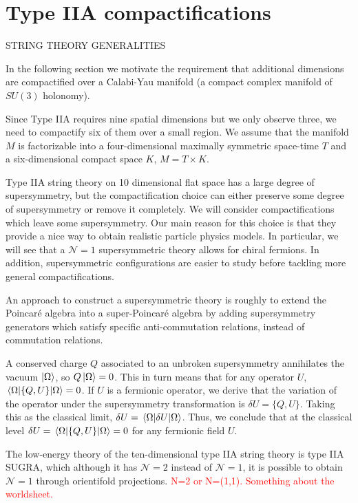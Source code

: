 \section{Type IIA compactifications}


STRING THEORY GENERALITIES


In the following section we motivate the requirement that additional dimensions are compactified
over a Calabi-Yau manifold (a compact complex manifold of $SU(3)$ holonomy).

Since Type IIA requires nine spatial dimensions but we only observe three, we need to compactify six of 
them over a small region.
We assume that the manifold $M$ is factorizable into a four-dimensional maximally symmetric space-time $T$ and a six-dimensional compact space $K$,
$M =  T\times K$.

Type IIA string theory on 10 dimensional flat space has a large degree of supersymmetry,
but the compactification choice can either preserve some degree of supersymmetry or remove it completely.
We will consider compactifications which leave some supersymmetry.
Our main reason for this choice is that they provide a nice way to obtain realistic particle 
physics models. 
In particular, we will see that a $\mathcal N=1$ supersymmetric theory allows for chiral fermions.
In addition, supersymmetric configurations are easier to study before tackling more general compactifications.

An approach to construct a supersymmetric theory is roughly to extend the Poincaré algebra into a super-Poincaré algebra
by adding supersymmetry generators which satisfy specific 
anti-commutation relations, instead of commutation relations. 

A conserved charge $Q$ associated to an unbroken supersymmetry annihilates the vacuum $\ket{\Omega}$,
so $Q\ket{\Omega}=0$.
This in turn means that for any operator $U$, $\ev{ \{Q,U\} }{\Omega}=0$.
If $U$ is a fermionic operator, we derive that the variation of the operator under the supersymmetry
transformation is $\delta U = \{ Q, U\}$.
Taking this as the classical limit, $\delta U = \ev{\delta U}{\Omega}$.
Thus, we conclude that at the classical level $\delta U =\ev{ \{Q,U\} }{\Omega}= 0$ for any fermionic field $U$.

The low-energy theory of the ten-dimensional type IIA string theory is type IIA SUGRA, which although it has
$\mathcal N=2$ instead of $\mathcal N=1$, it is possible to obtain $\mathcal N=1$ through orientifold projections. 
\textcolor{red}{N=2 or N=(1,1). Something about the worldsheet.}

